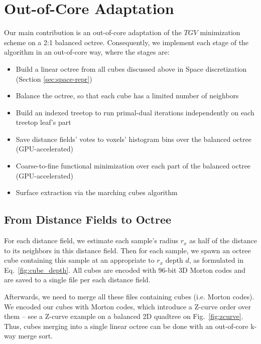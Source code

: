 \documentclass[10pt,twocolumn,letterpaper]{article}
\begin{document}
\section{Out-of-Core Adaptation}
\label{sec:out-of-core}

Our main contribution is an out-of-core adaptation of the $TGV$ minimization scheme on a 2:1 balanced octree. Consequently,
we implement each stage of the algorithm in an out-of-core way, where the stages are:

\begin{itemize}
    \item[\textbf{\ref{sec:linear-octree}}] Build a linear octree from all cubes discussed above in Space discretization (Section \ref{sec:space-repr})
    \item[\textbf{\ref{sec:balanced-octree}}] Balance the octree, so that each cube has a limited number of neighbors
    \item[\textbf{\ref{sec:treetop}}] Build an indexed treetop to run primal-dual iterations independently on each treetop leaf's part
    \item[\textbf{\ref{sec:hists-init}}] Save distance fields' votes to voxels' histogram bins over the balanced octree (GPU-accelerated)
    \item[\textbf{\ref{sec:iters}}] Coarse-to-fine functional minimization over each part of the balanced octree (GPU-accelerated)
    \item[\textbf{\ref{sec:cubes-marching}}] Surface extraction via the marching cubes algorithm
\end{itemize}

\subsection{From Distance Fields to Octree}
\label{sec:linear-octree}

For each distance field, we estimate each sample's radius $r_x$ as half of the distance to its neighbors in this distance field.
Then for each sample, we spawn an octree cube containing this sample at an appropriate to $r_x$ depth $d$, as formulated in Eq.~\ref{fig:cube_depth}.
All cubes are encoded with 96-bit 3D Morton codes \cite{morton1966computer} and are saved to a single file per each distance field.

Afterwards, we need to merge all these files containing cubes (i.e. Morton codes). We encoded our cubes with Morton codes, which introduce a Z-curve order over them -- see a Z-curve example on a balanced 2D quadtree on Fig.~\ref{fig:zcurve}.
Thus, cubes merging into a single linear octree can be done with an out-of-core k-way merge sort.
\end{document}
